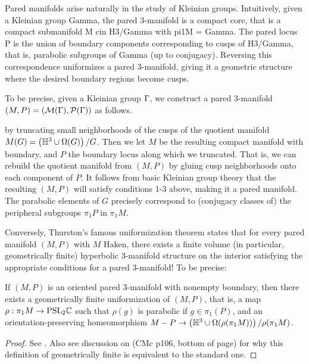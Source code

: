 Pared manifolds arise naturally in the study of Kleinian groups.  Intuitively,
given a Kleinian group Gamma, the pared 3-manifold is a compact core, that is
a compact submanifold M cin H3/Gamma with pi1M = Gamma. The pared locus P is
the union of boundary components corresponding to cusps of H3/Gamma, that is,
parabolic subgroups of Gamma (up to conjugacy). Reversing this correspondence
uniformizes a pared 3-manifold, giving it a geometric structure where the
desired boundary regions become cusps.

To be precise, given a Kleinian group $\Gamma$, we construct a pared 3-manifold
$(M,P)=(\mathcal{M}(\Gamma),\mathcal{P}(\Gamma))$ as follows.

by truncating small neighborhoods of the cusps of the quotient manifold $M(G)
= \left(\mathbb{H}^3\cup \Omega(G)\right)/G$.  Then we let $M$ be the resulting
compact manifold with boundary, and $P$ the boundary locus along which we
truncated.  That is, we can rebuild the quotient manifold from $(M,P)$ by
gluing cusp neighborhoods onto each component of $P$.  It follows from basic
Kleinian group theory that the resulting $(M,P)$ will satisfy conditions 1-3
above, making it a pared manifold.  The parabolic elements of $G$ precisely
correspond to (conjugacy classes of) the peripheral subgroups $\pi_1P$ in
$\pi_1M$.

Conversely, Thurston's famous uniformization theorem states that for every
pared manifold $(M,P)$ with $M$ Haken, there exists a finite volume (in
particular, geometrically finite) hyperbolic 3-manifold structure on the
interior satisfying the appropriate conditions for a pared 3-manifold! To be
precise:



\begin{thm}

If $(M,P)$ is an oriented pared 3-manifold with nonempty boundary, then
there exists a geometrically finite uniformization of $(M,P)$, that is, a map
$\rho: \pi_1M \to \mbox{\textrm{PSL}}_2\mathbb{C}$ such that $\rho(g)$ is
parabolic if $g \in \pi_1(P)$, and an orientation-preserving homeomorphism $M-P
\to \left(\mathbb{H}^3 \cup \Omega(\rho(\pi_1M))\right)/\rho(\pi_1M)$.

\end{thm}
\begin{proof}

See \cite{CMc}.
Also see discussion on (CMc p106, bottom of page) for why this definition of
geometrically finite is equivalent to the standard one.

\end{proof}

